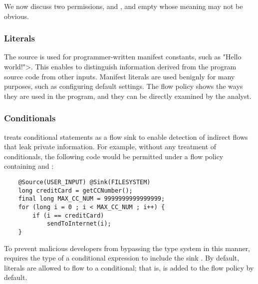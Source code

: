 


We now discuss two permissions,  and , and empty  whose meaning may not be obvious.

\subsubsection{Literals}
The  source is used for programmer-written manifest
constants, such as \<"Hello world!">.
This enables \theFlowChecker to distinguish information derived
from the program source code from other inputs.
Manifest literals are used benignly for many 
purposes, such as configuring default settings.
The flow policy shows the ways they are used in the program, and they can
be directly examined by the analyst.


\subsubsection{Conditionals \label{sec:conditionals}}
\TheFlowChecker treats conditional statements as a flow sink
to enable detection of indirect flows that leak private information.
For example, without any treatment of conditionals, the following code would
be permitted under a flow policy containing  and :

\begin{Verbatim}
    @Source(USER_INPUT) @Sink(FILESYSTEM)
    long creditCard = getCCNumber();
    final long MAX_CC_NUM = 9999999999999999;
    for (long i = 0 ; i < MAX_CC_NUM ; i++) {
        if (i == creditCard)
            sendToInternet(i);
    }
\end{Verbatim}

To prevent malicious developers from bypassing the type system in this manner,
\theFlowChecker requires the type of a
conditional expression to include the sink .
By default, literals are allowed to flow
to a conditional; that is,  is added to the flow policy by default.

